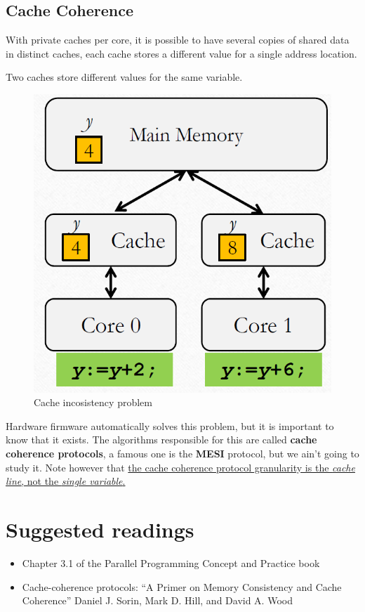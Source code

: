 \subsection{Cache Coherence}
\begin{paracol}{2}
   With private caches per core, it is possible to have several copies of shared data in distinct caches, each cache stores a different value for a single address location.
   
   \begin{definition}
      Two caches store different values for the same variable.
   \end{definition}
   
   \switchcolumn

   \begin{figure}[htbp]
      \centering
      \includegraphics{images/04/cache_coherence.png}
      \caption{Cache incosistency problem}
      \label{fig:04/cache_coherence}
   \end{figure}

\end{paracol}

Hardware firmware automatically solves this problem, but it is important to know that it exists.
The algorithms responsible for this are called \textbf{cache coherence protocols}, a famous one is the \textbf{MESI} protocol, but we ain't going to study it.
Note however that \ul{the cache coherence protocol granularity is the \textit{cache line}, not the \textit{single variable}.}
   
\section{Suggested readings}
\begin{itemize}
   \item
      Chapter 3.1 of the Parallel Programming Concept and Practice book
   \item
      Cache-coherence protocols: ``A Primer on Memory Consistency and Cache Coherence'' Daniel J. Sorin, Mark D. Hill, and David A. Wood
\end{itemize}